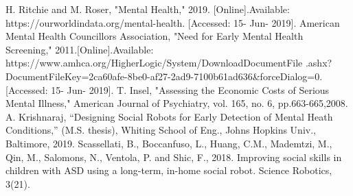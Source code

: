 \documentclass[letterpaper, 10 pt, conference]{ieeeconf}  %
\begin{document}
\begin{thebibliography}{99} %

 H. Ritchie and M. Roser, "Mental Health," 2019. [Online].Available: https://ourworldindata.org/mental-health. [Accessed: 15- Jun- 2019]. 
 American Mental Health Councillors Association, "Need for Early Mental Health Screening," 2011.[Online].Available: https://www.amhca.org/HigherLogic/System/DownloadDocumentFile .ashx?DocumentFileKey=2ca60afe-8be0-af27-2ad9-7100b61ad636&forceDialog=0. [Accessed: 15- Jun- 2019]. 
 T. Insel, "Assessing the Economic Costs of Serious Mental Illness," American Journal of Psychiatry, vol. 165, no. 6, pp.663-665,2008.
 A. Krishnaraj, “Designing Social Robots for Early Detection of Mental Heath Conditions,” (M.S. thesis), Whiting School of Eng., Johns Hopkins Univ., Baltimore, 2019.
 Scassellati, B., Boccanfuso, L., Huang, C.M., Mademtzi, M., Qin, M., Salomons, N., Ventola, P. and Shic, F., 2018. Improving social skills in children with ASD using a long-term, in-home social robot. Science Robotics, 3(21).

\end{thebibliography}
\end{document}
